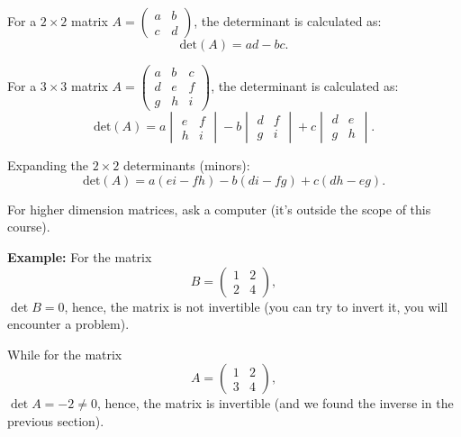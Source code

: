 \documentclass[]{article}
\begin{document}
	For a $2 \times 2$ matrix $A = \begin{pmatrix} a & b \\ c & d \end{pmatrix}$, the determinant is calculated as:
	$$
	\text{det}(A) = ad - bc.
	$$
	
	For a $3 \times 3$ matrix $A = \begin{pmatrix} a & b & c \\ d & e & f \\ g & h & i \end{pmatrix} $, the determinant is calculated as:
	$$
	\text{det}(A) =
	  a \begin{vmatrix} e & f \\ h & i \end{vmatrix}
	- b \begin{vmatrix} d & f \\ g & i \end{vmatrix}
	+ c \begin{vmatrix} d & e \\ g & h \end{vmatrix}.
	$$
	
	Expanding the $2 \times 2$ determinants (minors):
	$$
	\text{det}(A) = a(ei - fh) - b(di - fg) + c(dh - eg).
	$$
	
	For higher dimension matrices, ask a computer (it's outside the scope of this course).
	
	\noindent \textbf{Example:} For the matrix
	$$
	B = \begin{pmatrix} 1 & 2 \\ 2 & 4 \end{pmatrix},
	$$
	$\det{B} = 0$, hence, the matrix is not invertible (you can try to invert it, you will encounter a problem).
	
	While for the matrix
	$$
	A = \begin{pmatrix} 1 & 2 \\ 3 & 4 \end{pmatrix},
	$$
	$\det{A} = -2 \neq 0$, hence, the matrix is invertible (and we found the inverse in the previous section).
	
	
\end{document}
